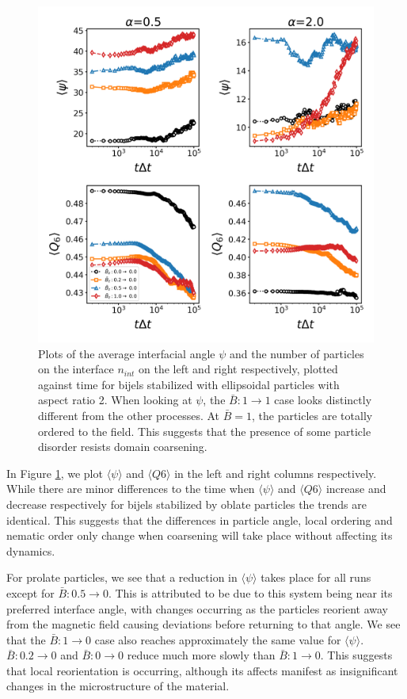 \begin{figure} 
\centering 
\includegraphics[scale=0.4]{../figures/results/paper2/interface_angle-nint-field_down.png} 
\caption{Plots of the average interfacial angle $\psi$ and the number of particles on the interface $n_{int}$ on the left and right respectively, plotted against time for bijels stabilized with ellipsoidal particles with aspect ratio 2. When looking at $\psi$, the $\bar{B}:1 \rightarrow 1$ case looks distinctly different from the other processes. At $\bar{B} = 1$, the particles are totally ordered to the field. This suggests that the presence of some particle disorder resists domain coarsening.} 
\label{fig:interface_angle-field_down} 
\end{figure}

In Figure \ref{fig:interface_angle-field_down}, we plot
$\langle \psi \rangle$ and $\langle Q6 \rangle$ in the left and
right columns respectively. While there are minor differences to the
time when $\langle \psi \rangle$ and $\langle Q6 \rangle$ increase
and decrease respectively for bijels stabilized by oblate particles the
trends are identical. This suggests that the differences in particle
angle, local ordering and nematic order only change when coarsening will
take place without affecting its dynamics.

For prolate particles, we see that a reduction in
$\langle \psi \rangle$ takes place for all runs except for
\(\bar{B}: 0.5\rightarrow 0\). This is attributed to be due to this
system being near its preferred interface angle, with changes occurring
as the particles reorient away from the magnetic field causing
deviations before returning to that angle. We see that the
\(\bar{B}: 1\rightarrow 0\) case also reaches approximately the same
value for $\langle \psi \rangle$. \(\bar{B}: 0.2\rightarrow 0\) and
\(\bar{B}: 0\rightarrow 0\) reduce much more slowly than
\(\bar{B}: 1\rightarrow 0\). This suggests that local reorientation is
occurring, although its affects manifest as insignificant changes in the
microstructure of the material.

